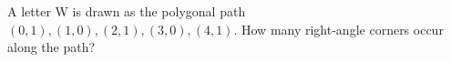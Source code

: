 A letter W is drawn as the polygonal path $(0,1),(1,0),(2,1),(3,0),(4,1)$. How many right-angle corners occur along the path?
